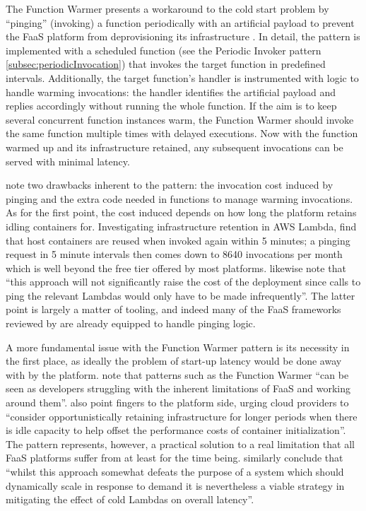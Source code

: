 The Function Warmer presents a workaround to the cold start problem by ``pinging'' (invoking) a function periodically with an artificial payload to prevent the FaaS platform from deprovisioning its infrastructure \parencite{leitner18industrialpractice}. In detail, the pattern is implemented with a scheduled function (see the Periodic Invoker pattern \ref{subsec:periodicInvocation}) that invokes the target function in predefined intervals. Additionally, the target function's handler is instrumented with logic to handle warming invocations: the handler identifies the artificial payload and replies accordingly without running the whole function. If the aim is to keep several concurrent function instances warm, the Function Warmer should invoke the same function multiple times with delayed executions. Now with the function warmed up and its infrastructure retained, any subsequent invocations can be served with minimal latency.

\textcite{leitner18industrialpractice} note two drawbacks inherent to the pattern: the invocation cost induced by pinging and the extra code needed in functions to manage warming invocations. As for the first point, the cost induced depends on how long the platform retains idling containers for. Investigating infrastructure retention in AWS Lambda, \textcite{lloydserverless} find that host containers are reused when invoked again within 5 minutes; a pinging request in 5 minute intervals then comes down to 8640 invocations per month which is well beyond the free tier offered by most platforms. \textcite{bardsley18optimizationStrategies} likewise note that ``this approach will not significantly raise the cost of the deployment since calls to ping the relevant Lambdas would only have to be made infrequently''. The latter point is largely a matter of tooling, and indeed many of the FaaS frameworks reviewed by \textcite{kritikos18frameworks} are already equipped to handle pinging logic.

A more fundamental issue with the Function Warmer pattern is its necessity in the first place, as ideally the problem of start-up latency would be done away with by the platform. \textcite{leitner18industrialpractice} note that patterns such as the Function Warmer ``can be seen as developers struggling with the inherent limitations of FaaS and working around them''. \textcite{lloydserverless} also point fingers to the platform side, urging cloud providers to ``consider opportunistically retaining infrastructure for longer periods when there is idle capacity to help offset the performance costs of container initialization''. The pattern represents, however, a practical solution to a real limitation that all FaaS platforms suffer from at least for the time being. \textcite{bardsley18optimizationStrategies} similarly conclude that ``whilst this approach somewhat defeats the purpose of a system which should dynamically scale in response to demand it is nevertheless a viable strategy in mitigating the effect of cold Lambdas on overall latency''.

